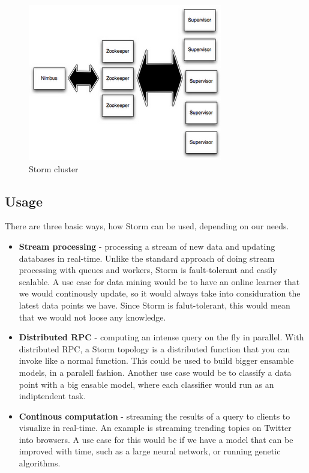 \documentclass[journal]{IEEEtran/IEEEtran}
\begin{document}
\begin{figure}[htbp]
    \begin{center}
        \includegraphics[scale=0.70]{img/storm-cluster.png}
        \caption{Storm cluster}
        \label{stormcluster}
    \end{center}
\end{figure}


\subsection{Usage}

There are three basic ways, how Storm can be used, depending on our needs. \\

\begin{itemize}
    \item \textbf{Stream processing} - processing a stream of new data and updating databases in real-time. Unlike the standard approach of doing stream processing with queues and workers, Storm is fault-tolerant and easily scalable. A use case for data mining would be to have an online learner that we would continously update, so it would always take into considuration the latest data points we have. Since Storm is falut-tolerant, this would mean that we would not loose any knowledge.\\
    \item \textbf{Distributed RPC} - computing an intense query on the fly in parallel. With distributed RPC, a Storm topology is a distributed function that you can invoke like a normal function. This could be used to build bigger ensamble models, in a paralell fashion. Another use case would be to classify a data point with a big ensable model, where each classifier would run as an indiptendent task.\\
    \item \textbf{Continous computation} - streaming the results of a query to clients to visualize in real-time. An example is streaming trending topics on Twitter into browsers. A use case for this would be if we have a model that can be improved with time, such as a large neural network, or running genetic algorithms.\\
\end{itemize}
\end{document}
